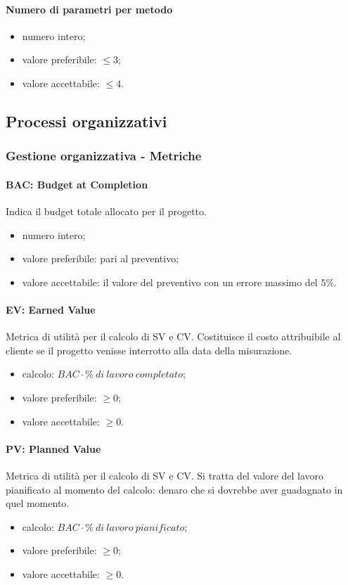 		\paragraph{Numero di parametri per metodo}
		\begin{itemize}
		\item numero intero;
		\item valore preferibile: $\leq 3$;
		\item valore accettabile: $ \leq 4$.
		\end{itemize}
		
	\subsection{Processi organizzativi}
		\subsubsection{Gestione organizzativa - Metriche}
		\paragraph{BAC: Budget at Completion}
		Indica il budget totale allocato per il progetto.
		\begin{itemize}
		\item numero intero;
		\item valore preferibile: pari al preventivo;
		\item valore accettabile: il valore del preventivo con un errore massimo del $5\%$.
		\end{itemize}
		
		\paragraph{EV: Earned Value}
		Metrica di utilità per il calcolo di SV e CV. Costituisce il costo attribuibile al cliente se il progetto venisse interrotto alla data della misurazione.
		\begin{itemize}
		\item calcolo: $BAC \cdot \% \  di \ lavoro \ completato$;
		\item valore preferibile: $\geq 0$;
		\item valore accettabile: $\geq 0$.
		\end{itemize}
		
		\paragraph{PV: Planned Value}
		Metrica di utilità per il calcolo di SV e CV. Si tratta del valore del lavoro pianificato al momento del calcolo: denaro che si dovrebbe aver guadagnato in quel momento.
		\begin{itemize}
		\item calcolo: $BAC \cdot \% \ di \ lavoro \ pianificato$;
		\item valore preferibile: $\geq 0$;
		\item valore accettabile: $\geq 0$.
		\end{itemize}
		
